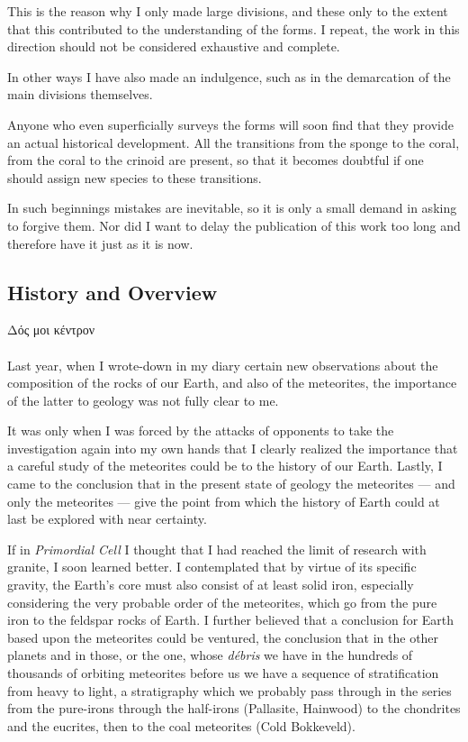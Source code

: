 \documentclass[a4paper, 12pt, oneside]{article}
\begin{document}
This is the reason why I only made large divisions, and these only to the extent that this contributed to the understanding of the forms. I repeat, the work in this direction should not be considered exhaustive and complete.

In other ways I have also made an indulgence, such as in the demarcation of the main divisions themselves.

Anyone who even superficially surveys the forms will soon find that they provide an actual historical development. All the transitions from the sponge to the coral, from the coral to the crinoid are present, so that it becomes doubtful if one should assign new species to these transitions.

In such beginnings mistakes are inevitable, so it is only a small demand in asking to forgive them. Nor did I want to delay the publication of this work too long and therefore have it just as it is now.
\clearpage
\subsection{History and Overview}
Δός μοι κέντρον%
\paragraph*{}
Last year, when I wrote-down in my diary certain new observations about the composition of the rocks of our Earth, and also of the meteorites, the importance of the latter to geology was not fully clear to me.

It was only when I was forced by the attacks of opponents to take the investigation again into my own hands that I clearly realized the importance that a careful study of the meteorites could be to the history of our Earth. Lastly, I came to the conclusion that in the present state of geology the meteorites --- and only the meteorites --- give the point from which the history of Earth could at last be explored with near certainty.

If in \emph{Primordial Cell} I thought that I had reached the limit of research with granite, I soon learned better. I contemplated that by virtue of its specific gravity, the Earth's core must also consist of at least solid iron, especially considering the very probable order of the meteorites, which go from the pure iron to the feldspar rocks of Earth. I further believed that a conclusion for Earth based upon the meteorites could be ventured, the conclusion that in the other planets and in those, or the one, whose \emph{débris} we have in the hundreds of thousands of orbiting meteorites before us we have a sequence of stratification from heavy to light, a stratigraphy which we probably pass through in the series from the pure-irons through the half-irons (Pallasite, Hainwood) to the chondrites and the eucrites, then to the coal meteorites (Cold Bokkeveld).
\end{document}
